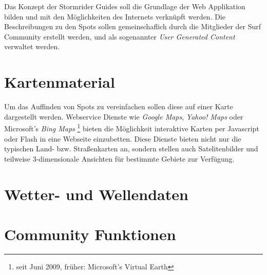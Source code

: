 Das Konzept der Stormrider Guides soll die Grundlage der Web
Applikation bilden und mit den Möglichkeiten des Internets verknüpft
werden. Die Beschreibungen zu den Spots sollen gemeinschaflich durch
die Mitglieder der Surf Community erstellt werden, und als sogenannter
\textit{User Generated Content} verwaltet werden.


\section{Kartenmaterial}

Um das Auffinden von Spots zu vereinfachen sollen diese auf einer
Karte dargestellt werden. Webservice Dienste wie \textit{Google Maps},
\textit{Yahoo! Maps} oder Microsoft's \textit{Bing Maps}
\footnote{seit Juni 2009, früher: Microsoft's Virtual Earth} bieten
die Möglichkeit interaktive Karten per Java\-script oder Flash in eine
Webseite einzubetten. Diese Dienste bieten nicht nur die typischen
Land- bzw. Straßenkarten an, sondern stellen auch Satelitenbilder und
teilweise 3-dimensionale Ansichten für bestimmte Gebiete zur
Verfügung.

\section{Wetter- und Wellendaten}

\section{Community Funktionen}

